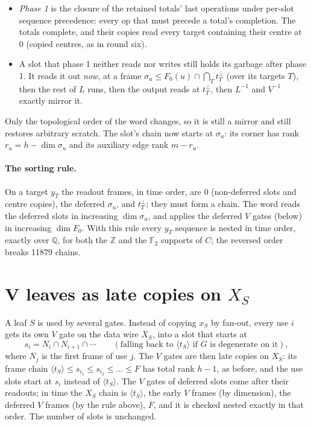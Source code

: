 \documentclass[11pt]{article}
\theoremstyle{remark}\newtheorem*{remark}{Remark}
\begin{document}
\begin{itemize}
\item \emph{Phase 1} is the closure of the retained totals' last operations under per-slot sequence precedence: every
  op that must precede a total's completion. The totals complete, and their copies read every target containing
  their centre at $0$ (copied centres, as in round six).
\item A slot that phase 1 neither reads nor writes still holds its garbage after phase 1. It reads it out
  \emph{now}, at a frame $\sigma_u\le F_0(u)\cap\bigcap_{T}t_T^\perp$ (over its targets $T$), then the rest of $L$ runs,
  then the output reads at $t_T^\perp$, then $L^{-1}$ and $V^{-1}$ exactly mirror it.
\end{itemize}
Only the topological order of the word changes, so it is still a mirror and still restores arbitrary scratch. The
slot's chain now starts at $\sigma_u$: its corner has rank $r_u=h-\dim\sigma_u$ and its auxiliary edge rank $m-r_u$.

\paragraph{The sorting rule.} On a target $y_T$ the readout frames, in time order, are $0$ (non-deferred slots and
centre copies), the deferred $\sigma_u$, and $t_T^\perp$; they must form a chain. The word reads the deferred slots
in increasing $\dim\sigma_u$, and applies the deferred $V$ gates (below) in increasing $\dim F_0$. With this rule
every $y_T$ sequence is nested in time order, exactly over $\mathbb Q$, for both the $\mathbb Z$ and the
$\mathbb F_2$ supports of $C$; the reversed order breaks 11879 chains.

\section{V leaves as late copies on $X_S$}
A leaf $S$ is used by several gates. Instead of copying $x_S$ by fan-out, every use $i$ gets its own $V$ gate on the
data wire $X_S$, into a slot that starts at
\[ s_i=N_i\cap N_{i+1}\cap\cdots \qquad(\text{falling back to }\langle t_S\rangle\text{ if $G$ is degenerate on it}), \]
where $N_j$ is the first frame of use $j$. The $V$ gates are then late copies on $X_S$: its frame chain
$\langle t_S\rangle\le s_{i_1}\le s_{i_2}\le\dots\le F$ has total rank $h-1$, as before, and the use slots start at
$s_i$ instead of $\langle t_S\rangle$. The $V$ gates of deferred slots come after their readouts; in time the $X_S$ chain
is $\langle t_S\rangle$, the early $V$ frames (by dimension), the deferred $V$ frames (by the rule above), $F$, and it
is checked nested exactly in that order. The number of slots is unchanged.
\end{document}
